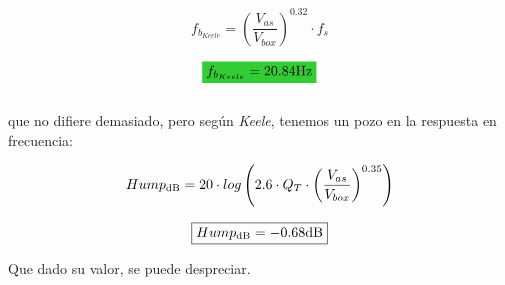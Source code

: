\begin{equation}
f_{b_{Keele}} = \left( \frac{V_{as}}{V_{box}} \right)^{0.32} \cdot f_{s}
\end{equation}


\begin{equation*}
\mathcolorbox{EQColor}{ f_{b_{Keele}} = 20.84 \si[per-mode=symbol]{\hertz} }
\end{equation*} \\

que no difiere demasiado, pero según \textit{Keele}, tenemos un pozo en la respuesta en frecuencia:

\begin{equation}
Hump_{\si[per-mode=symbol]{\decibel}} = 20 \cdot log \left( 2.6 \cdot Q_{T} \cdot \left( \frac{V_{as}}{V_{box}} \right)^{0.35} \right)
\end{equation}

\begin{equation*}
\boxed{ Hump_{\si[per-mode=symbol]{\decibel}} = -0.68 \si[per-mode=symbol]{\decibel} }
\end{equation*}

Que dado su valor, se puede despreciar. \\



 
\begin{table}[H]  %

    \setlength\arrayrulewidth{1.5pt}
    \def\clinecolor{\hhline{|>{\arrayrulecolor{white}}-%
    >{\arrayrulecolor{white}}|-|-|-|}}
	\caption{\footnotesize{Comparación de los valores diseñados (\textit{keele}) con los recomendados por el fabricante.}}
	\label{table:table_comparison_keele_recomendations}
\end{table}

